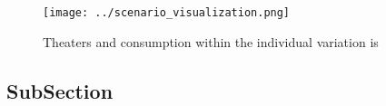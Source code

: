 \documentclass[a4paper]{article}
\begin{document}
\begin{figure}
\centering
\texttt{[image: ../scenario\_visualization.png]}
\caption{Theaters and consumption within the individual variation is
}
\end{figure}
 
\subsection{SubSection}
\end{document}
